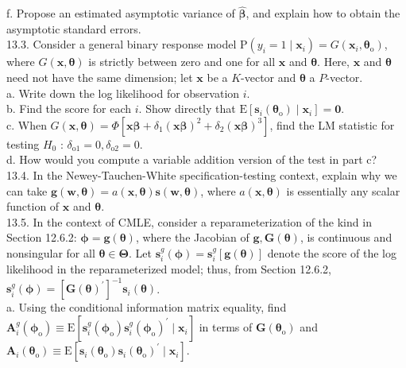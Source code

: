 \documentclass[10pt]{article}
\begin{document}
f. Propose an estimated asymptotic variance of $\hat{\boldsymbol{\beta}}$, and explain how to obtain the asymptotic standard errors.\\
13.3. Consider a general binary response model $\mathrm{P}\left(y_{i}=1 \mid \mathbf{x}_{i}\right)=G\left(\mathbf{x}_{i}, \boldsymbol{\theta}_{\mathrm{o}}\right)$, where $G(\mathbf{x}, \boldsymbol{\theta})$ is strictly between zero and one for all $\mathbf{x}$ and $\boldsymbol{\theta}$. Here, $\mathbf{x}$ and $\boldsymbol{\theta}$ need not have the same dimension; let $\mathbf{x}$ be a $K$-vector and $\boldsymbol{\theta}$ a $P$-vector.\\
a. Write down the log likelihood for observation $i$.\\
b. Find the score for each $i$. Show directly that $\mathrm{E}\left[\mathbf{s}_{i}\left(\boldsymbol{\theta}_{\mathrm{o}}\right) \mid \mathbf{x}_{i}\right]=\mathbf{0}$.\\
c. When $G(\mathbf{x}, \boldsymbol{\theta})=\Phi\left[\mathbf{x} \boldsymbol{\beta}+\delta_{1}(\mathbf{x} \boldsymbol{\beta})^{2}+\delta_{2}(\mathbf{x} \boldsymbol{\beta})^{3}\right]$, find the LM statistic for testing $H_{0}$ : $\delta_{\mathrm{o} 1}=0, \delta_{\mathrm{o} 2}=0$.\\
d. How would you compute a variable addition version of the test in part c?\\
13.4. In the Newey-Tauchen-White specification-testing context, explain why we can take $\mathbf{g}(\mathbf{w}, \boldsymbol{\theta})=a(\mathbf{x}, \boldsymbol{\theta}) \mathbf{s}(\mathbf{w}, \boldsymbol{\theta})$, where $a(\mathbf{x}, \boldsymbol{\theta})$ is essentially any scalar function of $\mathbf{x}$ and $\boldsymbol{\theta}$.\\
13.5. In the context of CMLE, consider a reparameterization of the kind in Section 12.6.2: $\boldsymbol{\phi}=\mathbf{g}(\boldsymbol{\theta})$, where the Jacobian of $\mathbf{g}, \mathbf{G}(\boldsymbol{\theta})$, is continuous and nonsingular for all $\boldsymbol{\theta} \in \boldsymbol{\Theta}$. Let $\mathbf{s}_{i}^{g}(\boldsymbol{\phi})=\mathbf{s}_{i}^{g}[\mathbf{g}(\boldsymbol{\theta})]$ denote the score of the log likelihood in the reparameterized model; thus, from Section 12.6.2, $\mathbf{s}_{i}^{g}(\boldsymbol{\phi})=\left[\mathbf{G}(\boldsymbol{\theta})^{\prime}\right]^{-1} \mathbf{s}_{i}(\boldsymbol{\theta})$.\\
a. Using the conditional information matrix equality, find $\mathbf{A}_{i}^{g}\left(\boldsymbol{\phi}_{\mathrm{o}}\right) \equiv \mathrm{E}\left[\mathbf{s}_{i}^{g}\left(\boldsymbol{\phi}_{\mathrm{o}}\right) \mathbf{s}_{i}^{g}\left(\boldsymbol{\phi}_{\mathrm{o}}\right)^{\prime} \mid \mathbf{x}_{i}\right]$ in terms of $\mathbf{G}\left(\boldsymbol{\theta}_{\mathrm{o}}\right)$ and $\mathbf{A}_{i}\left(\boldsymbol{\theta}_{\mathrm{o}}\right) \equiv \mathrm{E}\left[\mathbf{s}_{i}\left(\boldsymbol{\theta}_{\mathrm{o}}\right) \mathbf{s}_{i}\left(\boldsymbol{\theta}_{\mathrm{o}}\right)^{\prime} \mid \mathbf{x}_{i}\right]$.\\
\end{document}

